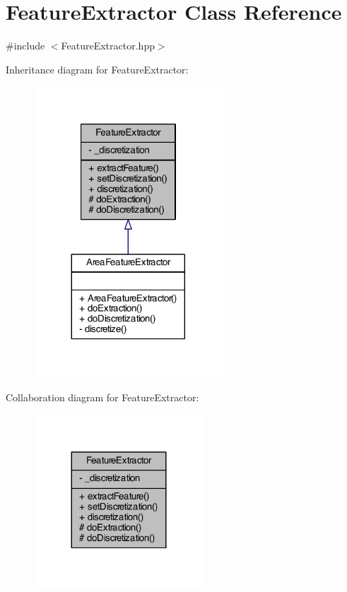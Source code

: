\hypertarget{class_feature_extractor}{\section{Feature\+Extractor Class Reference}
\label{class_feature_extractor}
}


{\ttfamily \#include $<$Feature\+Extractor.\+hpp$>$}



Inheritance diagram for Feature\+Extractor\+:
\nopagebreak
\begin{figure}[H]
\begin{center}
\leavevmode
\includegraphics[width=200pt]{class_feature_extractor__inherit__graph}
\end{center}
\end{figure}


Collaboration diagram for Feature\+Extractor\+:
\nopagebreak
\begin{figure}[H]
\begin{center}
\leavevmode
\includegraphics[width=180pt]{class_feature_extractor__coll__graph}
\end{center}
\end{figure}
